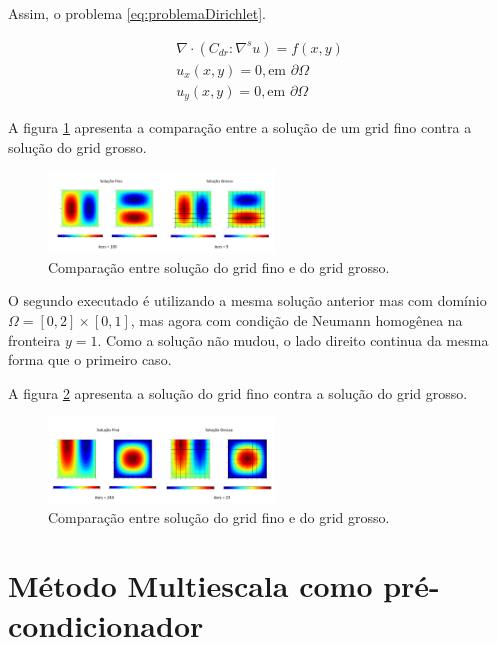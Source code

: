 Assim, o problema \ref{eq:problemaDirichlet}.

\begin{equation} \label{eq:problemaDirichlet}
\begin{matrix}
\nabla \cdot  (C_{dr} : \nabla ^s u) = f(x,y)
\\ 
u_x (x, y)  =  0, \text{em } \partial \Omega
\\ 
u_y (x, y)  =  0, \text{em } \partial \Omega

\end{matrix}
\end{equation}

A figura \ref{fig:DirichletHomogeneo} apresenta a comparação entre a solução de um grid fino contra a solução do grid grosso.  

\begin{figure}[!htbp]
\label{fig:DirichletHomogeneo}
\centering
\includegraphics[width=6cm]{chap08/figs/DirichletHomogeneoTemp.png}
\caption{Comparação entre solução do grid fino e do grid grosso. }
\end{figure}


O segundo executado é utilizando a mesma solução anterior mas com domínio $\Omega = [0, 2] \times [0, 1]$, mas agora com condição de Neumann homogênea na fronteira $y=1$. Como a solução não mudou, o lado direito continua da mesma forma que o primeiro caso.

A figura \ref{fig:NeumannHomogeneo} apresenta a solução do grid fino contra a solução do grid grosso.

\begin{figure}[!htbp]
\label{fig:NeumannHomogeneo}
\centering
\includegraphics[width=6cm]{chap08/figs/NeumannHomogeneoTemp.png}
\caption{Comparação entre solução do grid fino e do grid grosso. }
\end{figure}



\section{Método Multiescala como pré-condicionador}

